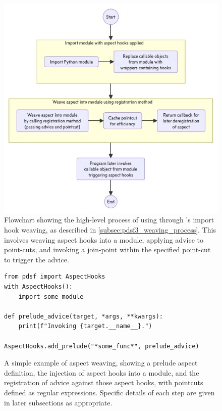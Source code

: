 \begin{figure}
  \centering
  \includegraphics[width=0.8\columnwidth]{40_pydysofu_rewrite/diagrams/aspect-hook-weaving-high-level.pdf}
  \caption{Flowchart showing the high-level process of using \aop{} through
  \pdsfthree{}'s import hook weaving, as described in
  \cref{subsec:pdsf3_weaving_process}. This involves weaving aspect hooks into a
  module, applying advice to point-cuts, and invoking a join-point within the
  specified point-cut to trigger the advice.}
  \label{fig:high-level-import-hook-weaving-steps}
\end{figure}


\begin{figure}
    \begin{lstlisting}[style=footnotesize_python]
from pdsf import AspectHooks
with AspectHooks():
    import some_module
    
def prelude_advice(target, *args, **kwargs):
    print(f"Invoking {target.__name__}.")

AspectHooks.add_prelude("*some_func*", prelude_advice)
    \end{lstlisting}
    \caption{A simple example of aspect weaving, showing a prelude aspect definition, the injection of aspect hooks into a module, and the registration of advice against those aspect hooks, with pointcuts defined as regular expressions. Specific details of each step are given in later subsections as appropriate.}
    \label{fig:simple_example_of_aspect_weaving}
\end{figure}

